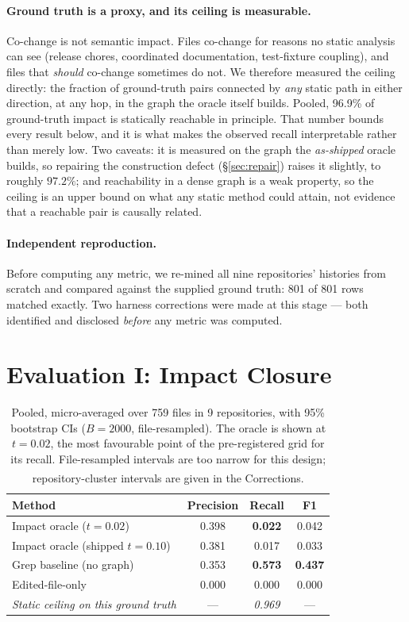 \documentclass[sigconf,review,anonymous]{acmart}
\newcommand{\corr}{\textsuperscript{\dag}}
\begin{document}
\paragraph{Ground truth is a proxy, and its ceiling is measurable.} Co-change is not
semantic impact. Files co-change for reasons no static analysis can see (release chores,
coordinated documentation, test-fixture coupling), and files that \emph{should} co-change
sometimes do not. We therefore measured the ceiling directly: the fraction of ground-truth
pairs connected by \emph{any} static path in either direction, at any hop, in the graph the
oracle itself builds. Pooled, 96.9\% of ground-truth impact is statically reachable in
principle. That number bounds every result below, and it is what makes the observed recall interpretable
rather than merely low. Two caveats: it is measured on the graph the \emph{as-shipped} oracle builds, so
repairing the construction defect (\S\ref{sec:repair}) raises it slightly, to roughly $97.2\%$; and
reachability in a dense graph is a weak property, so the ceiling is an upper bound on what any static
method could attain, not evidence that a reachable pair is causally related.

\paragraph{Independent reproduction.} Before computing any metric, we re-mined all nine
repositories' histories from scratch and compared against the supplied ground truth: 801 of
801 rows matched exactly. Two harness corrections were made at this stage --- both
identified and disclosed \emph{before} any metric was computed.

\section{Evaluation I: Impact Closure}\label{sec:eval1}

\begin{table}[t]
\caption{Pooled, micro-averaged over 759 files in 9 repositories, with 95\% bootstrap CIs
($B=2000$, file-resampled). The oracle is shown at $t=0.02$, the most favourable point of
the pre-registered grid for its recall. File-resampled intervals are too narrow for this
design; repository-cluster intervals are given in the Corrections\protect\corr{}.}
\label{tab:eval1}
\small
\begin{tabular}{lccc}
\toprule
Method & Precision & Recall & F1 \\
\midrule
Impact oracle ($t{=}0.02$) & 0.398 & \textbf{0.022} & 0.042 \\
Impact oracle (shipped $t{=}0.10$) & 0.381 & 0.017 & 0.033 \\
Grep baseline (no graph) & 0.353 & \textbf{0.573} & \textbf{0.437} \\
Edited-file-only & 0.000 & 0.000 & 0.000 \\
\midrule
\emph{Static ceiling on this ground truth} & --- & \emph{0.969} & --- \\
\bottomrule
\end{tabular}
\end{table}
\end{document}
